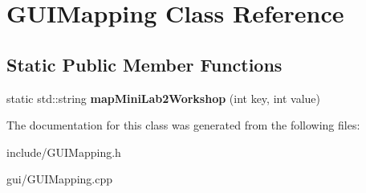 \hypertarget{classGUIMapping}{}\section{G\+U\+I\+Mapping Class Reference}
\label{classGUIMapping}
\subsection*{Static Public Member Functions}
\begin{DoxyCompactItemize}
\item 
static std\+::string {\bfseries map\+Mini\+Lab2\+Workshop} (int key, int value)\hypertarget{classGUIMapping_afc4d931e878ba22a7530d39c66c3a966}{}\label{classGUIMapping_afc4d931e878ba22a7530d39c66c3a966}

\end{DoxyCompactItemize}


The documentation for this class was generated from the following files\+:\begin{DoxyCompactItemize}
\item 
include/G\+U\+I\+Mapping.\+h\item 
gui/G\+U\+I\+Mapping.\+cpp\end{DoxyCompactItemize}
